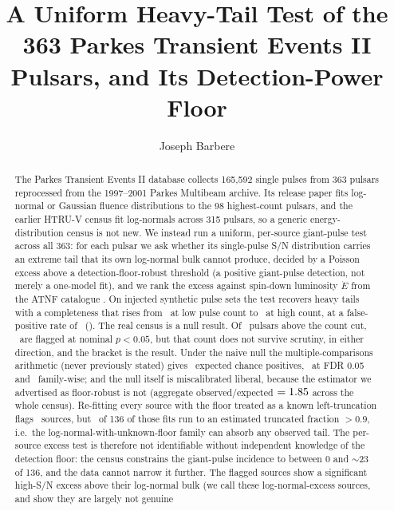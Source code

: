 \documentclass[twocolumn]{aastex631}
\begin{document}
\title{A Uniform Heavy-Tail Test of the 363 Parkes Transient Events II Pulsars, and Its
Detection-Power Floor}
\author[0009-0008-3289-4447]{Joseph Barbere}

\begin{abstract}
The Parkes Transient Events II database \citep{yang2025} collects 165{,}592 single pulses from 363
pulsars reprocessed from the 1997--2001 Parkes Multibeam archive. Its release paper fits log-normal
or Gaussian fluence distributions to the 98 highest-count pulsars, and the earlier HTRU-V census
\citep{burkespolaor2012} fit log-normals across 315 pulsars, so a generic energy-distribution
census is not new. We instead run a uniform, per-source giant-pulse test across all 363: for
each pulsar we ask whether its single-pulse S/N distribution carries an extreme tail that its own
log-normal bulk cannot produce, decided by a Poisson excess above a detection-floor-robust threshold
(a positive giant-pulse detection, not merely a one-model fit), and we rank the excess against
spin-down luminosity $\dot E$ from the ATNF catalogue \citep{manchester2005}. On injected synthetic
pulse sets the test recovers heavy tails with a completeness that rises from \ptSynCompLow\ at low
pulse count to \ptSynCompHigh\ at high count, at a false-positive rate of \ptSynFP\
(\ptSynRecovered). The real census is a null result. Of \ptRealNFit\ pulsars above the
count cut, \ptRealNHeavy\ are flagged at nominal $p<0.05$, but that count does not survive
scrutiny, in either direction, and the bracket is the result. Under the naive null the
multiple-comparisons arithmetic (never previously stated) gives \ptStatChance\ expected chance
positives, \ptStatBH\ at FDR 0.05 and \ptStatBonf\ family-wise; and the null itself is
miscalibrated liberal, because the estimator we advertised as floor-robust is not (aggregate
observed/expected $=1.85$ across the whole census). Re-fitting every source with the
floor treated as a known left-truncation flags \ptTruncNHeavy\ sources, but
\ptTruncFNine\ of 136 of those fits run to an estimated truncated fraction $>0.9$, i.e.\ the
log-normal-with-unknown-floor family can absorb any observed tail. The per-source excess
test is therefore not identifiable without independent knowledge of the detection
floor: the census constrains the giant-pulse incidence to between 0 and $\sim$23 of 136, and
the data cannot narrow it further. The flagged sources show a significant high-S/N excess above their log-normal
bulk (we call these log-normal-excess sources, and show they are largely not genuine

\end{abstract}
\end{document}

